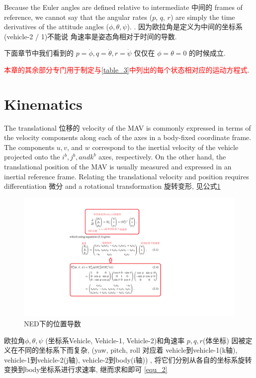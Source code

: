 \documentclass[UTF8,a4paper,10pt,nocolorlinks]{ctexart}
\begin{document}
Because the Euler angles are defined relative to intermediate 中间的 frames of reference, we cannot say that the angular rates ($p$, $q$, $r$) are simply the time derivatives of the attitude angles ($\phi, \theta, \psi$).
. 因为欧拉角是定义为中间的坐标系(vehicle-2 / 1)不能说 角速率是姿态角相对于时间的导数.\par
下面章节中我们看到的 $p = \dot{\phi}, q = \dot{\theta}, r = \dot{\psi}$ 仅仅在 $\phi = \theta = 0$ 的时候成立. \par
\textcolor{red}{本章的其余部分专门用于制定与\ref{table_3}中列出的每个状态相对应的运动方程式}.

\section{Kinematics}
The translational 位移的 velocity of the MAV is commonly expressed in terms
of the velocity components along each of the axes in a body-fixed
coordinate frame. The components $u, v$, and $w$ correspond to the
inertial velocity of the vehicle projected onto the $i^{b}, j^{b}, and k^{b}$ axes,
respectively. On the other hand, the translational position of the MAV is
usually measured and expressed in an inertial reference frame. Relating
the translational velocity and position requires differentiation 微分 and a
rotational transformation 旋转变形, 见公式\ref{equ_1}
\begin{figure}[htpb]
  \centering
  \includegraphics[width=\textwidth]{picture/equ_1.png}
  \caption{NED下的位置导数}
  \label{equ_1}
\end{figure}

\par 欧拉角$\phi, \theta, \psi$ (坐标系Vehicle, Vehicle-1, Vehicle-2)和角速率 $p, q, r$(体坐标) 因被定义在不同的坐标系下而复杂, (yaw, pitch, roll 对应着 vehicle到vehicle-1(k轴), vehicle-1到vehicle-2(j轴), vehicle-2到body(i轴))
, 将它们分别从各自的坐标系旋转变换到body坐标系进行求速率, 继而求和即可 \ref{equ_2}
\end{document}
